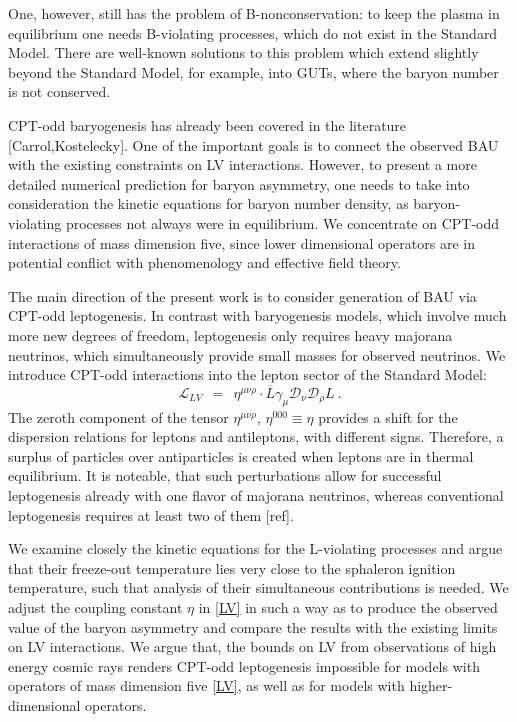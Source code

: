 \documentclass[12pt]{revtex4}
\newcommand{\md}{\mathcal{D}}
\newcommand{\ov}{\overline}
\begin{document}
	One, however, still has the problem of B-nonconservation: to keep the plasma
	in equilibrium one needs B-violating processes, which do not exist in the
	Standard Model.
	There are well-known solutions to this problem which extend slightly beyond
	the Standard Model, for example, into GUTs, where the baryon number is not
	conserved.


	CPT-odd baryogenesis has already been covered in the literature [Carrol,Kostelecky].
	One of the important goals is to connect the observed BAU with the existing constraints
	on LV interactions.
	However, to present a more detailed numerical prediction for baryon asymmetry, 
	one needs to take into consideration the kinetic equations for baryon number density,
	as baryon-violating processes not always were in equilibrium.
	We concentrate on CPT-odd interactions of mass dimension five, since
	lower dimensional operators are in potential conflict with phenomenology and
	effective field theory.
	
	The main direction of the present work is to consider generation of BAU via CPT-odd
	leptogenesis.
	In contrast with baryogenesis models, 
	which involve much more new degrees of freedom, leptogenesis only
	requires heavy majorana neutrinos, which simultaneously provide small
	masses for observed neutrinos.
	We introduce CPT-odd interactions into the lepton sector of the Standard Model:
\begin{equation}
\label{LV}
	\mathcal{L}_{LV} ~~=~~ \eta^{\mu\nu\rho}\cdot \ov{L}\gamma_\mu \md_\nu \md_\rho L~.
\end{equation}
	The zeroth component of the tensor $ \eta^{\mu\nu\rho} $, $ \eta^{000} \equiv \eta $ provides a 
	shift for the dispersion relations for leptons and antileptons, with different signs. 
	Therefore, a surplus of particles over antiparticles is created when leptons are
	in thermal equilibrium.
	It is noteable, that such perturbations allow for successful leptogenesis already
	with one flavor of majorana neutrinos, whereas conventional leptogenesis requires
	at least two of them [ref].
	

	We examine closely the kinetic equations for the L-violating processes and argue that
	their freeze-out temperature lies very close to the sphaleron ignition temperature, such
	that analysis of their simultaneous contributions is needed. 
	We adjust the coupling constant $ \eta $ in \eqref{LV} in such a way as to produce 
	the observed value of the baryon asymmetry and compare the results with the existing
	limits on LV interactions. 
	We argue that, the bounds on LV from observations of high energy cosmic rays renders
	CPT-odd leptogenesis impossible for models with operators of mass dimension five \eqref{LV}, 
	as well as for models with higher-dimensional operators.
	
\end{document}
